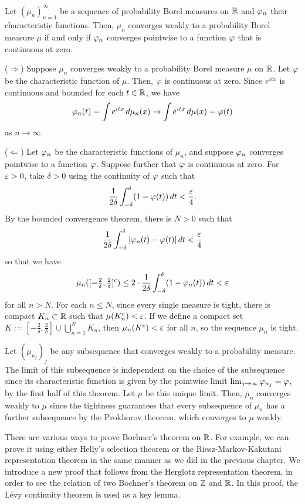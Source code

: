 \documentclass[a4paper]{article}
\begin{document}
\begin{thm}
Let $(\mu_n)_{n=1}^\infty$ be a sequence of probability Borel measures on $\mathbb{R}$ and $\varphi_n$ their characteristic functions.
Then, $\mu_n$ converges weakly to a probability Borel measure $\mu$ if and only if $\varphi_n$ converges pointwise to a function $\varphi$ that is continuous at zero.
\end{thm}
\begin{pf}
($\Rightarrow$)
Suppose $\mu_n$ converges weakly to a probability Borel measure $\mu$ on $\mathbb{R}$.
Let $\varphi$ be the characteristic function of $\mu$.
Then, $\varphi$ is continuous at zero.
Since $e^{itx}$ is continuous and bounded for each $t\in\mathbb{R}$, we have
\[\varphi_n(t)=\int e^{itx}\,d\mu_n(x)\to\int e^{itx}\,d\mu(x)=\varphi(t)\]
as $n\to\infty$.

($\Leftarrow$)
Let $\varphi_n$ be the characteristic functions of $\mu_n$, and suppose $\varphi_n$ converges pointwise to a function $\varphi$.
Suppose further that $\varphi$ is continuous at zero.
For $\varepsilon>0$, take $\delta>0$ using the continuity of $\varphi$ such that
\[\frac1{2\delta}\int_{-\delta}^\delta(1-\varphi(t))\,dt<\frac{\varepsilon}4.\]
By the bounded convergence theorem, there is $N>0$ such that
\[\frac1{2\delta}\int_{-\delta}^\delta|\varphi_n(t)-\varphi(t)|\,dt<\frac{\varepsilon}4\]
so that we have
\[\mu_n([-\tfrac2\delta,\tfrac2\delta]^c)\le2\cdot\frac1{2\delta}\int_{-\delta}^\delta(1-\varphi_n(t))\,dt<\varepsilon\]
for all $n>N$.
For each $n\le N$, since every single measure is tight, there is compact $K_n\subset\mathbb{R}$ such that $\mu(K_n^c)<\varepsilon$.
If we define a compact set $K:=[-\frac2\delta,\frac2\delta]\cup\bigcup_{n=1}^NK_n$, then $\mu_n(K^c)<\varepsilon$ for all $n$, so the sequence $\mu_n$ is tight.

Let $(\mu_{n_j})_j$ be any subsequence that converges weakly to a probability measure.
The limit of this subsequence is independent on the choice of the subsequence since its characteristic function is given by the pointwise limit $\lim_{j\to\infty}\varphi_{n_j}=\varphi$, by the first half of this theorem.
Let $\mu$ be this unique limit.
Then, $\mu_n$ converges weakly to $\mu$ since the tightness guarantees that every subsequence of $\mu_n$ has a further subsequence by the Prokhorov theorem, which converges to $\mu$ weakly.
\end{pf}


There are various ways to prove Bochner's theorem on $\mathbb{R}$.
For example, we can prove it using either Helly's selection theorem or the Riesz-Markov-Kakutani representation theorem in the same manner as we did in the previous chapter.
We introduce a new proof that follows from the Herglotz representation theorem, in order to see the relation of two Bochner's theorem on $\mathbb{Z}$ and $\mathbb{R}$.
In this proof, the L\'evy continuity theorem is used as a key lemma.
\end{document}
